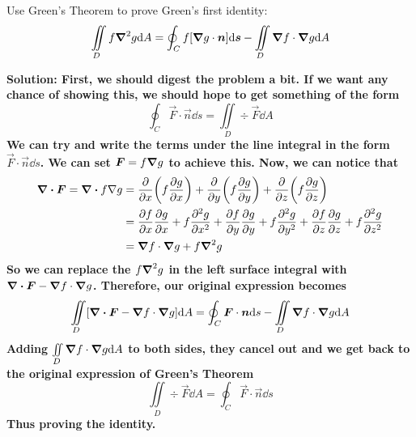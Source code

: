 \begin{example}
    Use Green's Theorem to prove Green's first identity:
    \[ \iint\limits_D f\boldsymbol\nabla^2g\dd A = \oint_C f[\boldsymbol\nabla g\cdot \boldsymbol{n}]\dd \boldsymbol{s} - \iint\limits_D \boldsymbol\nabla f \cdot \boldsymbol\nabla g\dd A\]\par
    \bf{Solution:} First, we should digest the problem a bit. If we want any chance of showing this, we should hope to get something of the form
    \[ \oint_C \vec F \cdot \vec n \dd s = \iint\limits_D \div \vec F \dd A \]
    We can try and write the terms under the line integral in the form $\vec F \cdot \vec n \dd s$. We can set $\boldsymbol{F} = f\boldsymbol\nabla g$ to achieve this. Now, we can notice that
    \begin{align*}
        \div \vec F = \div f\nabla g &= \pdv{x}\pqty{f\pdv{g}{x}}+\pdv{y}\pqty{f\pdv{g}{y}}+\pdv{z}\pqty{f\pdv{g}{z}} \\
        &= \pdv{f}{x}\pdv{g}{x} + f\pdv[2]{g}{x} + \pdv{f}{y}\pdv{g}{y} + f\pdv[2]{g}{y} + \pdv{f}{z}\pdv{g}{z}+f\pdv[2]{g}{z} \\
        &= \bnabla f \cdot \bnabla g + f\bnabla^2 g
    \end{align*}
    So we can replace the $f\boldsymbol\nabla^2g$ in the left surface integral with $\div \boldsymbol{F} - \grad f\cdot \boldsymbol\nabla g$. Therefore, our original expression becomes
    \[ \iint\limits_D [\div\boldsymbol{F} - \grad f \cdot \grad g]\dd A= \oint_C \boldsymbol{F} \cdot \boldsymbol{n} \dd s - \iint\limits_D \grad f \cdot \grad g \dd A\]
    Adding $\iint\limits_D \grad f\cdot \grad g\dd A$ to both sides, they cancel out and we get back to the original expression of Green's Theorem
    \[ \iint\limits_D \div \vec F \dd A = \oint_C \vec F \cdot \vec n \dd s \]
    Thus proving the identity.
\end{example}
